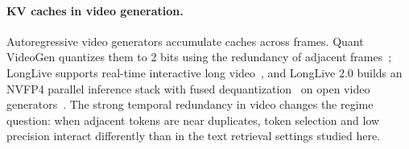 \paragraph{KV caches in video generation.}
Autoregressive video generators accumulate caches across frames.  Quant
VideoGen quantizes them to 2 bits using the redundancy of adjacent
frames~\citep{xi2026quantvideogen}; LongLive supports real-time interactive
long video~\citep{yang2026longlive}, and LongLive 2.0 builds an NVFP4 parallel
inference stack with fused dequantization~\citep{chen2026longlive2} on open
video generators~\citep{wan2025wan}.  The strong temporal redundancy in video
changes the regime question: when adjacent tokens are near duplicates, token
selection and low precision interact differently than in the text retrieval
settings studied here.
